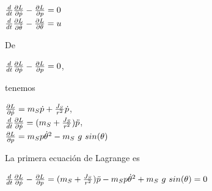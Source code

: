 \documentclass{article}
\begin{document}
\begin{itemize}
\begin{center}
		$\frac{d}{dt}\pdv{L}{\dot{p}}-\pdv{L}{p}=0$\\
		$\frac{d}{dt}\pdv{L}{\dot{\theta}}-\pdv{L}{\theta}=u$
	\end{center}
	De
	\begin{center}
		$\frac{d}{dt}\pdv{L}{\dot{p}}-\pdv{L}{p}=0$,
	\end{center}
	tenemos
	\begin{center}
		$\pdv{L}{\dot{p}}= m_{S}\dot{p} + \frac{J_{S}}{r^2}\dot{p}$,\\
		$\frac{d}{dt}\pdv{L}{\dot{p}}= (m_{S} + \frac{J_{S}}{r^2})\ddot{p}$,\\
		$\pdv{L}{p}= m_{S}p\dot{\theta}^2 - m_{S}\ g\ sin(\theta)$
	\end{center}
	La primera ecuación de Lagrange es
	\begin{center}
		$\frac{d}{dt}\pdv{L}{\dot{p}}-\pdv{L}{p}= (m_{S} + \frac{J_{S}}{r^2})\ddot{p} - m_{S}p\dot{\theta}^2 + m_{S}\ g\ sin(\theta) = 0$
	\end{center}
	

\end{itemize}
\end{document}
